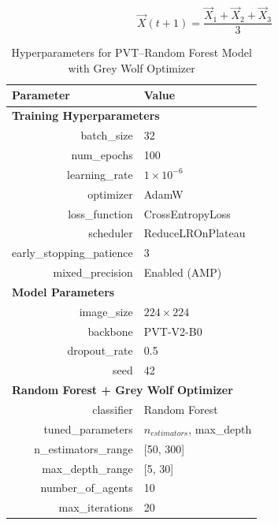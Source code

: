 \documentclass{styles/svproc}
\begin{document}
\begin{equation}
\label{eq:gwo}
\vec{X}(t+1) = \frac{\vec{X}_1 + \vec{X}_2 + \vec{X}_3}{3}
\end{equation}
\endgroup

\begin{table}[!h]
\caption{Hyperparameters for PVT--Random Forest Model with Grey Wolf Optimizer}
\begin{center}
\begin{tabular}{r@{\quad}l}
\hline
\multicolumn{1}{l}{\rule{0pt}{4pt}\textbf{Parameter}} & 
\multicolumn{1}{l}{\textbf{Value}} \\
\hline
\multicolumn{2}{l}{\rule{0pt}{4pt}\textbf{Training Hyperparameters}} \\
batch\_size & 32 \\
num\_epochs & 100 \\
learning\_rate & $1 \times 10^{-6}$ \\
optimizer & AdamW \\
loss\_function & CrossEntropyLoss \\
scheduler & ReduceLROnPlateau \\
early\_stopping\_patience & 3 \\
mixed\_precision & Enabled (AMP) \\
\hline
\multicolumn{2}{l}{\rule{0pt}{4pt}\textbf{Model Parameters}} \\
image\_size & $224 \times 224$ \\
backbone & PVT-V2-B0 \\
dropout\_rate & 0.5 \\
seed & 42 \\
\hline
\multicolumn{2}{l}{\rule{0pt}{4pt}\textbf{Random Forest + Grey Wolf Optimizer}} \\
classifier & Random Forest \\
tuned\_parameters & $n_{estimators}$, max\_depth \\
n\_estimators\_range & [50, 300] \\
max\_depth\_range & [5, 30] \\
number\_of\_agents & 10 \\
max\_iterations & 20 \\
\hline
\end{tabular}
\end{center}
\label{tab:hyperparameters}
\end{table}
\end{document}
